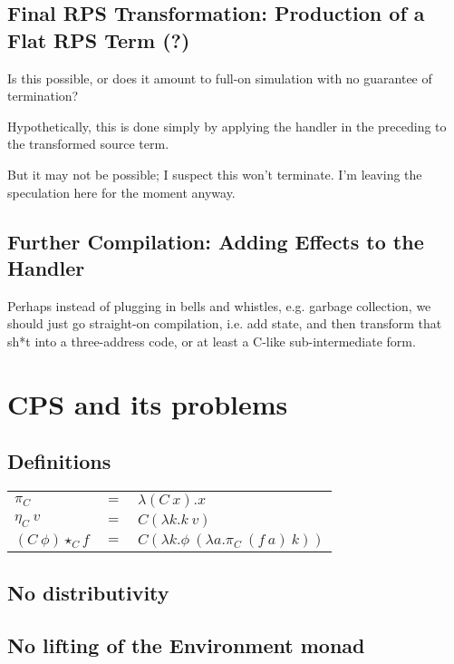 \documentclass{article}
\begin{document}
\subsection{Final RPS Transformation: Production of a Flat RPS Term (?)}

Is this possible, or does it amount to full-on simulation with no guarantee of termination?

Hypothetically, this is done simply by applying the handler in the preceding to the transformed source term.

But it may not be possible; I suspect this won't terminate.  I'm leaving the speculation here for the moment anyway.

\subsection{Further Compilation: Adding Effects to the Handler}

Perhaps instead of plugging in bells and whistles, e.g. garbage collection, we should just go straight-on compilation, i.e. add state, and then transform that sh*t into a three-address code, or at least a C-like sub-intermediate form.

\section{CPS and its problems}

\subsection{Definitions}

\begin{tabular}[t]{lll}
$\pi_{C} $&$=$&$ \lambda (C\ x).x$\\
$\eta_{C}\ v $&$=$&$ C (\lambda k . k\ v)$\\
$(C\ \phi) \star_{C} f $&$=$&$ C (\lambda k . \phi\ (\lambda a .\pi_{C}\ (f\ a)\ k))$\\
\end{tabular}


\subsection{No distributivity}

\subsection{No lifting of the Environment monad}


%
%


\end{document}
